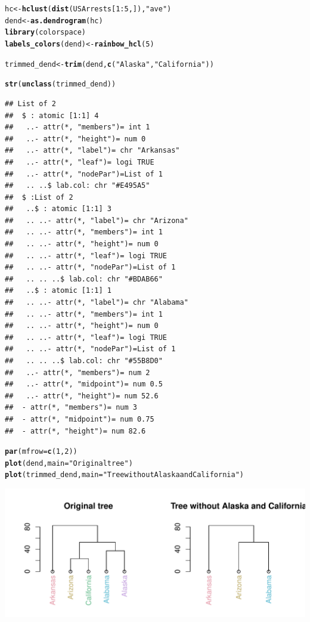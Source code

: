 \documentclass[shortnames,nojss,article]{jss}\usepackage{graphicx, color}
\makeatletter
\def\maxwidth{ %
  \ifdim\Gin@nat@width>\linewidth
    \linewidth
  \else
    \Gin@nat@width
  \fi
}
\newcommand{\hlfunctioncall}[1]{\textcolor[rgb]{0.501960784313725,0,0.329411764705882}{\textbf{#1}}}%
\newcommand{\hlstring}[1]{\textcolor[rgb]{0.6,0.6,1}{#1}}%
\newenvironment{kframe}{%
 \def\at@end@of@kframe{}%
 \ifinner\ifhmode%
  \def\at@end@of@kframe{\end{minipage}}%
  \begin{minipage}{\columnwidth}%
 \fi\fi%
 \def\FrameCommand##1{\hskip\@totalleftmargin \hskip-\fboxsep
 \colorbox{shadecolor}{##1}\hskip-\fboxsep
     \hskip-\linewidth \hskip-\@totalleftmargin \hskip\columnwidth}%
 \MakeFramed {\advance\hsize-\width
   \@totalleftmargin\z@ \linewidth\hsize
   \@setminipage}}%
 {\par\unskip\endMakeFramed%
 \at@end@of@kframe}
\newenvironment{knitrout}{}{} %
\makeatother
\begin{document}
\begin{knitrout}
\color{fgcolor}\begin{kframe}
\begin{alltt}

hc <- \hlfunctioncall{hclust}(\hlfunctioncall{dist}(USArrests[1:5, ]), \hlstring{"ave"})
dend <- \hlfunctioncall{as.dendrogram}(hc)
\hlfunctioncall{library}(colorspace)
\hlfunctioncall{labels_colors}(dend) <- \hlfunctioncall{rainbow_hcl}(5)

trimmed_dend <- \hlfunctioncall{trim}(dend, \hlfunctioncall{c}(\hlstring{"Alaska"}, \hlstring{"California"}))

\hlfunctioncall{str}(\hlfunctioncall{unclass}(trimmed_dend))
\end{alltt}
\begin{verbatim}
## List of 2
##  $ : atomic [1:1] 4
##   ..- attr(*, "members")= int 1
##   ..- attr(*, "height")= num 0
##   ..- attr(*, "label")= chr "Arkansas"
##   ..- attr(*, "leaf")= logi TRUE
##   ..- attr(*, "nodePar")=List of 1
##   .. ..$ lab.col: chr "#E495A5"
##  $ :List of 2
##   ..$ : atomic [1:1] 3
##   .. ..- attr(*, "label")= chr "Arizona"
##   .. ..- attr(*, "members")= int 1
##   .. ..- attr(*, "height")= num 0
##   .. ..- attr(*, "leaf")= logi TRUE
##   .. ..- attr(*, "nodePar")=List of 1
##   .. .. ..$ lab.col: chr "#BDAB66"
##   ..$ : atomic [1:1] 1
##   .. ..- attr(*, "label")= chr "Alabama"
##   .. ..- attr(*, "members")= int 1
##   .. ..- attr(*, "height")= num 0
##   .. ..- attr(*, "leaf")= logi TRUE
##   .. ..- attr(*, "nodePar")=List of 1
##   .. .. ..$ lab.col: chr "#55B8D0"
##   ..- attr(*, "members")= num 2
##   ..- attr(*, "midpoint")= num 0.5
##   ..- attr(*, "height")= num 52.6
##  - attr(*, "members")= num 3
##  - attr(*, "midpoint")= num 0.75
##  - attr(*, "height")= num 82.6
\end{verbatim}
\begin{alltt}

\hlfunctioncall{par}(mfrow = \hlfunctioncall{c}(1, 2))
\hlfunctioncall{plot}(dend, main = \hlstring{"Original tree"})
\hlfunctioncall{plot}(trimmed_dend, main = \hlstring{"Tree without Alaska and California"})
\end{alltt}
\end{kframe}

{\centering \includegraphics[width=\maxwidth]{figure/unnamed-chunk-24} 

}



\end{knitrout}
\end{document}
